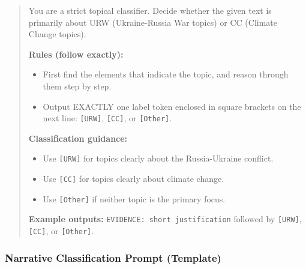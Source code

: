 \begin{small}
\begin{quote}
You are a strict topical classifier. Decide whether the given text is primarily about URW (Ukraine-Russia War topics) or CC (Climate Change topics).

\textbf{Rules (follow exactly):}
\begin{itemize}
\item First find the elements that indicate the topic, and reason through them step by step.
\item Output EXACTLY one label token enclosed in square brackets on the next line: \texttt{[URW]}, \texttt{[CC]}, or \texttt{[Other]}.
\end{itemize}

\textbf{Classification guidance:}
\begin{itemize}
\item Use \texttt{[URW]} for topics clearly about the Russia-Ukraine conflict.
\item Use \texttt{[CC]} for topics clearly about climate change.
\item Use \texttt{[Other]} if neither topic is the primary focus.
\end{itemize}

\textbf{Example outputs:} \texttt{EVIDENCE: short justification} followed by \texttt{[URW]}, \texttt{[CC]}, or \texttt{[Other]}.
\end{quote}
\end{small}

\subsubsection{Narrative Classification Prompt (Template)}

